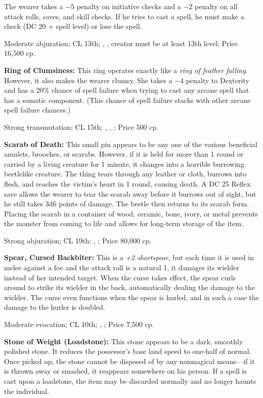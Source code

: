 The wearer takes a $-5$ penalty on initiative checks and a $-2$ penalty on all attack rolls, saves, and skill checks. If he tries to cast a spell, he must make a  check (DC 20 + spell level) or lose the spell.

Moderate abjuration; CL 13th; , , creator must be at least 13th level; Price 16,500 cp.

\textbf{Ring of Clumsiness:} This ring operates exactly like a \emph{ring of feather falling}. However, it also makes the wearer clumsy. She takes a $-4$ penalty to Dexterity and has a 20\% chance of spell failure when trying to cast any arcane spell that has a somatic component. (This chance of spell failure stacks with other arcane spell failure chances.)

Strong transmutation; CL 15th; , , ; Price 500 cp.

\textbf{Scarab of Death:} This small pin appears to be any one of the various beneficial amulets, brooches, or scarabs. However, if it is held for more than 1 round or carried by a living creature for 1 minute, it changes into a horrible burrowing beetlelike creature. The thing tears through any leather or cloth, burrows into flesh, and reaches the victim's heart in 1 round, causing death. A DC 25 Reflex save allows the wearer to tear the scarab away before it burrows out of sight, but he still takes 3d6 points of damage. The beetle then returns to its scarab form. Placing the scarab in a container of wood, ceramic, bone, ivory, or metal prevents the monster from coming to life and allows for long-term storage of the item.

Strong abjuration; CL 19th; , ; Price 80,000 cp.

\textbf{Spear, Cursed Backbiter:} This is a \emph{+2 shortspear}, but each time it is used in melee against a foe and the attack roll is a natural 1, it damages its wielder instead of her intended target. When the curse takes effect, the spear curls around to strike its wielder in the back, automatically dealing the damage to the wielder. The curse even functions when the spear is hurled, and in such a case the damage to the hurler is doubled.

Moderate evocation; CL 10th; , ; Price 7,500 cp.

\textbf{Stone of Weight (Loadstone):} This stone appears to be a dark, smoothly polished stone. It reduces the possessor's base land speed to one-half of normal. Once picked up, the stone cannot be disposed of by any nonmagical means---if it is thrown away or smashed, it reappears somewhere on his person. If a  spell is cast upon a loadstone, the item may be discarded normally and no longer haunts the individual.

